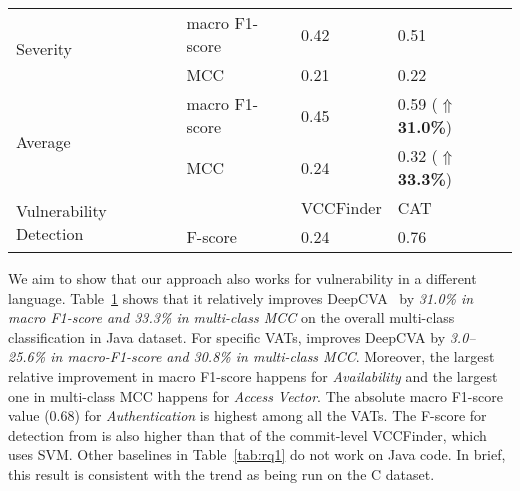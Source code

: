 \begin{table}[t]
\begin{center}
\begin{tabular}{l|p{2.0cm}<{\centering}|p{1.6cm}<{\centering}|p{1.5cm}<{\centering}}
			\hline
			\multirow{2}{*}{Severity}        & macro F1-score                             &   0.42         & 0.51\\
			\cline{2-4}
			& MCC                                 &   0.21         & 0.22\\
			\hline
			\hline
			\multirow{2}{*}{Average}         & macro F1-score                             &    0.45        & 0.59 ($\Uparrow${\bf 31.0\%})\\
			\cline{2-4}
			& MCC                                 & 0.24           & 0.32 ($\Uparrow${\bf 33.3\%})\\
			\hline
                        \hline
\multirow{2}{*}{Vulnerability Detection} &  & VCCFinder & CAT \\
\cline{2-4}
 & F-score & 0.24 & 0.76 \\
\hline
		\end{tabular}
		\label{rq2_results}
	\end{center}
\end{table}

We aim to show that our approach also works for vulnerability in a
different language. Table~\ref{rq2_results} shows that it relatively
improves DeepCVA~\cite{deepCVA-ase21} by {\em 31.0\% in macro F1-score
and 33.3\% in multi-class MCC} on the overall multi-class
classification in Java dataset. For specific VATs, {\tool} improves
DeepCVA by {\em 3.0--25.6\% in macro-F1-score and 30.8\% in
multi-class MCC}. Moreover, the largest relative improvement in macro
F1-score happens for {\em Availability} and the largest one in
multi-class MCC happens for {\em Access Vector}.
The absolute macro F1-score value (0.68) for {\em Authentication} is
highest among all the VATs.
%
The F-score for detection from {\tool} is also higher than that of the
commit-level VCCFinder, which uses SVM. Other baselines in
Table~\ref{tab:rq1} do not work on Java code. In brief, this result is
consistent with the trend as {\tool} being run on the C dataset.



